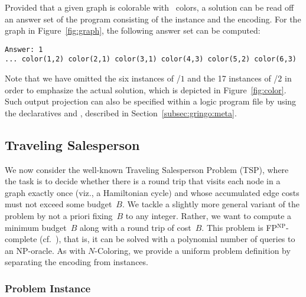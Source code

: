 Provided that a given graph is colorable with~ colors,
a solution can be read off an answer set of the program consisting
of the instance and the encoding.
For the graph in Figure~\ref{fig:graph},
the following answer set can be computed:%
%
\begin{lstlisting}[numbers=none]
Answer: 1
... color(1,2) color(2,1) color(3,1) color(4,3) color(5,2) color(6,3)
\end{lstlisting}
%
Note that we have omitted the six instances of /$1$ and the
17 instances of /$2$ in order to emphasize the actual solution,
which is depicted in Figure~\ref{fig:color}.
Such output projection can also be specified within a logic program file by
using the declaratives  and ,
described in Section~\ref{subsec:gringo:meta}.


\subsection{Traveling Salesperson}\label{subsec:ex:tsp}

We now consider the well-known Traveling Salesperson Problem (TSP),
where the task is to decide whether there is a round trip that visits
each node in a graph exactly once (viz., a Hamiltonian cycle) and whose
accumulated edge costs must not exceed some budget~$B$.
We tackle a slightly more general variant of the problem by not
a priori fixing~$B$ to any integer.
Rather,
we want to compute a minimum budget~$B$ along with a round trip of cost~$B$.
This problem is FP$^\textrm{NP}$-complete (cf.~\cite{papadimitriou94a}),
that is, it can be solved with a polynomial number of queries to an NP-oracle.
As with $N$-Coloring,
we provide a uniform problem definition by separating the encoding from instances.

\subsubsection{Problem Instance}\label{subsec:tsp:instance}


